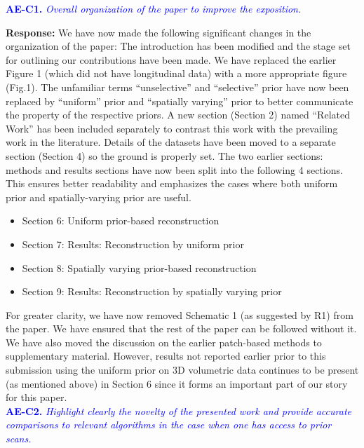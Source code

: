 \documentclass{article}
\begin{document}
\textcolor{blue}{\textbf{AE-C1.}\textit{ Overall organization of the paper to improve the exposition.}}

\textbf{Response:} 
We have now made the following significant changes in the organization of the paper:
The introduction has been modified and the stage set for outlining our contributions have been made.  We have replaced the earlier Figure 1 (which did not have longitudinal data) with a more appropriate figure (Fig.1). The unfamiliar terms ``unselective'' and ``selective'' prior have now been replaced by ``uniform'' prior and ``spatially varying'' prior to better communicate the property of the respective priors.
A new section  (Section 2) named ``Related Work'' has been included separately to contrast this work with the prevailing work in the literature. 
Details of the datasets have been moved to a separate section (Section 4) so the ground is properly set.
The two earlier sections: methods and results sections have now been split into the following 4 sections. This ensures better readability and emphasizes the cases where both uniform prior and spatially-varying prior are useful.
\begin{itemize}
 \item Section 6: Uniform prior-based reconstruction
 \item Section 7: Results: Reconstruction by uniform prior
 \item Section 8: Spatially varying prior-based reconstruction
 \item Section 9: Results: Reconstruction by spatially varying prior
   \end{itemize}
For greater clarity, we have now removed Schematic 1 (as suggested by R1) from the paper. We have  ensured that the rest of the paper can be followed without it. We have also moved the discussion on the earlier patch-based methods to supplementary material. However, results not reported earlier prior to this submission using the uniform prior on 3D volumetric data continues to be present (as mentioned above) in Section 6 since it forms an important part of our story for this paper.\\

\textcolor{blue}{\textbf{AE-C2.}\textit{ Highlight clearly the novelty of the presented work and provide accurate comparisons to relevant algorithms in the case when one has access to prior scans.}}
\end{document}
